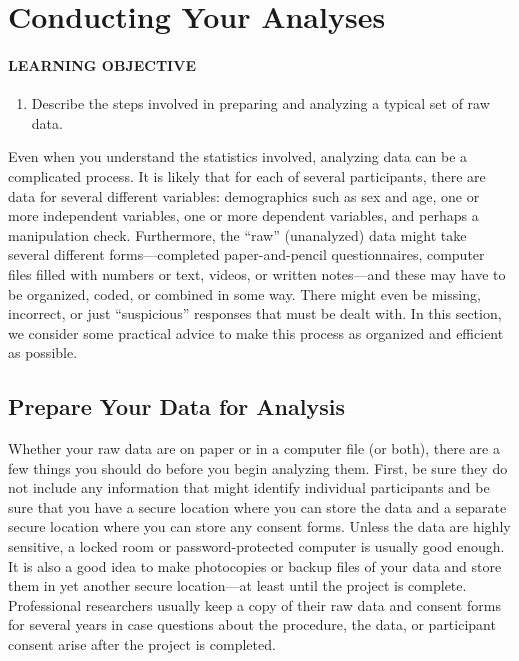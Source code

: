 \documentclass[
]{krantz}
\providecommand{\tightlist}{%
  \setlength{\itemsep}{0pt}\setlength{\parskip}{0pt}}
\begin{document}
\section{Conducting Your Analyses}\label{conducting-your-analyses}

\paragraph*{LEARNING OBJECTIVE}\label{learning-objective}

\begin{enumerate}
\def\labelenumi{\arabic{enumi}.}
\tightlist
\item
  Describe the steps involved in preparing and analyzing a typical set of raw data.
\end{enumerate}

Even when you understand the statistics involved, analyzing data can be a complicated process. It is likely that for each of several participants, there are data for several different variables: demographics such as sex and age, one or more independent variables, one or more dependent variables, and perhaps a manipulation check. Furthermore, the ``raw'' (unanalyzed) data might take several different forms---completed paper-and-pencil questionnaires, computer files filled with numbers or text, videos, or written notes---and these may have to be organized, coded, or combined in some way. There might even be missing, incorrect, or just ``suspicious'' responses that must be dealt with. In this section, we consider some practical advice to make this process as organized and efficient as possible.

\subsection*{Prepare Your Data for Analysis}\label{prepare-your-data-for-analysis}


Whether your raw data are on paper or in a computer file (or both), there are a few things you should do before you begin analyzing them. First, be sure they do not include any information that might identify individual participants and be sure that you have a secure location where you can store the data and a separate secure location where you can store any consent forms. Unless the data are highly sensitive, a locked room or password-protected computer is usually good enough. It is also a good idea to make photocopies or backup files of your data and store them in yet another secure location---at least until the project is complete. Professional researchers usually keep a copy of their raw data and consent forms for several years in case questions about the procedure, the data, or participant consent arise after the project is completed.
\end{document}
